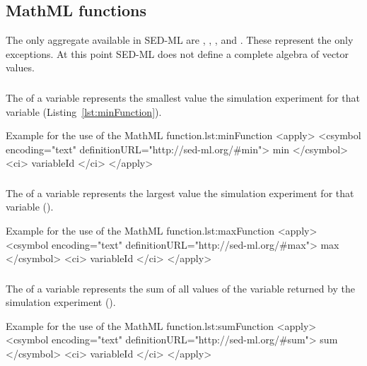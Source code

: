 \subsection{MathML functions}
The only aggregate  available in SED-ML are \hyperref[fun:min]{}, \hyperref[fun:max]{}, \hyperref[fun:sum]{}, and \hyperref[fun:product]{}. These represent the only exceptions. At this point SED-ML does not define a complete algebra of vector values.

\subsubsection*{}
\label{fun:min}
The  of a variable represents the smallest value the simulation experiment for that variable (Listing~\ref{lst:minFunction}). 
\begin{myXmlLst}{Example for the use of the MathML  function.}{lst:minFunction}
<apply>
 	<csymbol encoding="text" definitionURL="http://sed-ml.org/#min">
 		min
 	</csymbol>
 	<ci> variableId </ci>
</apply>
\end{myXmlLst}

\subsubsection*{}
\label{fun:max}
The  of a variable represents the largest value the simulation experiment for that variable ().
\begin{myXmlLst}{Example for the use of the MathML  function.}{lst:maxFunction}
<apply>
 	<csymbol encoding="text" definitionURL="http://sed-ml.org/#max">
 		max
 	</csymbol>
 	<ci> variableId </ci>
</apply>
\end{myXmlLst}

\subsubsection*{}
\label{fun:sum}
The  of a variable represents the sum of all values of the variable returned by the simulation experiment ().
\begin{myXmlLst}{Example for the use of the MathML  function.}{lst:sumFunction}
<apply>
 	<csymbol encoding="text" definitionURL="http://sed-ml.org/#sum">
 		sum
 	</csymbol>
 	<ci> variableId </ci>
</apply>
\end{myXmlLst}

